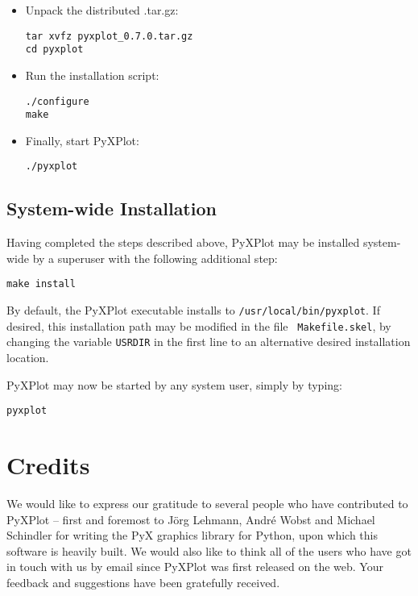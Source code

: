 \begin{itemize}
\item Unpack the distributed .tar.gz:

\begin{verbatim}
tar xvfz pyxplot_0.7.0.tar.gz
cd pyxplot
\end{verbatim}

\item Run the installation script:

\begin{verbatim}
./configure
make
\end{verbatim}

\item Finally, start PyXPlot:

\begin{verbatim}
./pyxplot
\end{verbatim}

\end{itemize}

\subsection{System-wide Installation}

Having completed the steps described above, PyXPlot may be installed
system-wide by a superuser with the following additional
step:

\begin{verbatim}
make install
\end{verbatim}

By default, the PyXPlot executable installs to {\tt /usr/local/bin/pyxplot}.
If desired, this installation path may be modified in the file {\tt
Makefile.skel}, by changing the variable {\tt USRDIR} in the first line to an
alternative desired installation location.

PyXPlot may now be started by any system user, simply by typing:

\begin{verbatim}
pyxplot
\end{verbatim}

\section{Credits}

We would like to express our gratitude to several people who have contributed
to PyXPlot -- first and foremost to J\"org Lehmann,
Andr\'e Wobst and Michael Schindler for writing the PyX graphics library for Python, upon which
this software is heavily built. We would also like to think all of the users
who have got in touch with us by email since PyXPlot was first released on the
web.  Your feedback and suggestions have been gratefully received.

